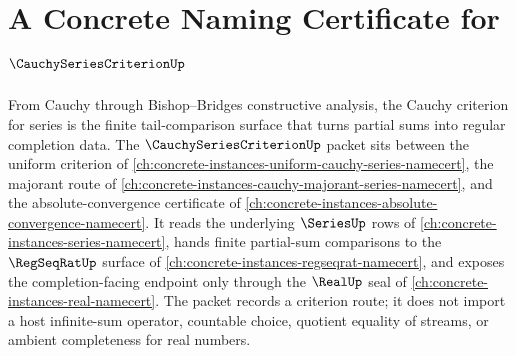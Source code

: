 \chapter{A Concrete Naming Certificate for $\CauchySeriesCriterionUp$}
\label{ch:concrete-instances-cauchy-series-criterion-namecert}

From Cauchy through Bishop--Bridges constructive analysis, the Cauchy criterion for series is the finite tail-comparison surface that turns partial sums into regular completion data. The $\CauchySeriesCriterionUp$ packet sits between the uniform criterion of \autoref{ch:concrete-instances-uniform-cauchy-series-namecert}, the majorant route of \autoref{ch:concrete-instances-cauchy-majorant-series-namecert}, and the absolute-convergence certificate of \autoref{ch:concrete-instances-absolute-convergence-namecert}. It reads the underlying $\SeriesUp$ rows of \autoref{ch:concrete-instances-series-namecert}, hands finite partial-sum comparisons to the $\RegSeqRatUp$ surface of \autoref{ch:concrete-instances-regseqrat-namecert}, and exposes the completion-facing endpoint only through the $\RealUp$ seal of \autoref{ch:concrete-instances-real-namecert}. The packet records a criterion route; it does not import a host infinite-sum operator, countable choice, quotient equality of streams, or ambient completeness for real numbers.

